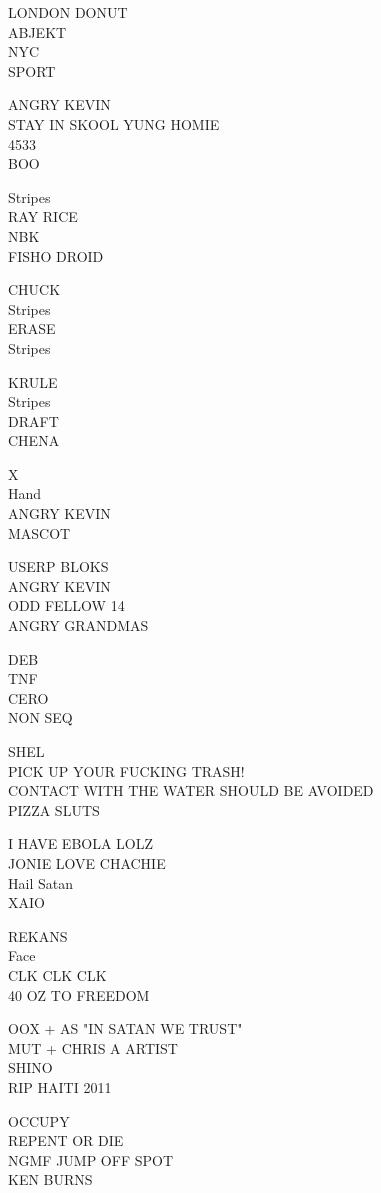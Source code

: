 \documentclass[10pt,letterpaper]{article}
\begin{document}
LONDON DONUT\\
ABJEKT\\
NYC\\
SPORT

ANGRY KEVIN\\
STAY IN SKOOL YUNG HOMIE\\
4533\\
BOO

Stripes\\
RAY RICE\\
NBK\\
FISHO DROID

CHUCK\\
Stripes\\
ERASE\\
Stripes

KRULE\\
Stripes\\
DRAFT\\
CHENA

X\\
Hand\\
ANGRY KEVIN\\
MASCOT

USERP BLOKS\\
ANGRY KEVIN\\
ODD FELLOW 14\\
ANGRY GRANDMAS

DEB\\
TNF\\
CERO\\
NON SEQ

SHEL\\
PICK UP YOUR FUCKING TRASH!\\
CONTACT WITH THE WATER SHOULD BE AVOIDED\\
PIZZA SLUTS

I HAVE EBOLA LOLZ\\
JONIE LOVE CHACHIE\\
Hail Satan\\
XAIO

REKANS\\
Face\\
CLK CLK CLK\\
40 OZ TO FREEDOM

OOX + AS "IN SATAN WE TRUST"\\
MUT + CHRIS A ARTIST\\
SHINO\\
RIP HAITI 2011

OCCUPY\\
REPENT OR DIE\\
NGMF JUMP OFF SPOT\\
KEN BURNS
\end{document}
